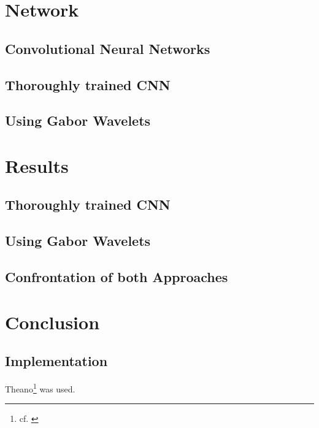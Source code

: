 \documentclass[11pt, a4paper]{article}
\begin{document}



\newpage

\section{Network}

\subsection{Convolutional Neural Networks}

\subsection{Thoroughly trained CNN}

\subsection{Using Gabor Wavelets}

\newpage

\section{Results}

\subsection{Thoroughly trained CNN}

\subsection{Using Gabor Wavelets}

\subsection{Confrontation of both Approaches}

\newpage

\section{Conclusion}

\newpage

\begin{appendix}
	\section{Implementation}
	
	Theano\footnote{cf. \cite{theano}} was used.
	
\end{appendix}
\end{document}
